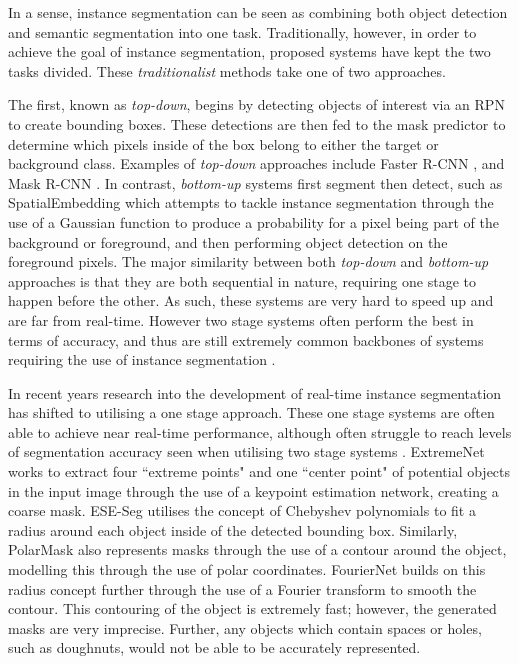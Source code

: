 In a sense, instance segmentation can be seen as combining both object detection and semantic segmentation into one task. Traditionally, however, in order to achieve the goal of instance segmentation, proposed systems have kept the two tasks divided. These \textit{traditionalist} methods take one of two approaches. 

The first, known as \textit{top-down}, begins by detecting objects of interest via an RPN to create bounding boxes. These detections are then fed to the mask predictor to determine which pixels inside of the box belong to either the target or background class. Examples of \textit{top-down} approaches include Faster R-CNN \cite{ren_faster_2015}, and Mask R-CNN \cite{he_mask_2017}. In contrast, \textit{bottom-up} systems first segment then detect, such as SpatialEmbedding \cite{neven_instance_2019} which attempts to tackle instance segmentation through the use of a Gaussian function to produce a probability for a pixel being part of the background or foreground, and then performing object detection on the foreground pixels. The major similarity between both \textit{top-down} and \textit{bottom-up} approaches is that they are both sequential in nature, requiring one stage to happen before the other. As such, these systems are very hard to speed up and are far from real-time. However two stage systems often perform the best in terms of accuracy, and thus are still extremely common backbones of systems requiring the use of instance segmentation \cite{soviany_optimizing_2018}.

In recent years research into the development of real-time instance segmentation has shifted to utilising a one stage approach. These one stage systems are often able to achieve near real-time performance, although often struggle to reach levels of segmentation accuracy seen when utilising two stage systems \cite{soviany_optimizing_2018}. ExtremeNet \cite{zhou_bottom-up_2019} works to extract four ``extreme points" and one ``center point" of potential objects in the input image through the use of a keypoint estimation network, creating a coarse mask. ESE-Seg \cite{xu_explicit_2019} utilises the concept of Chebyshev polynomials to fit a radius around each object inside of the detected bounding box. Similarly, PolarMask \cite{xie_polarmask_2020} also represents masks through the use of a contour around the object, modelling this through the use of polar coordinates. FourierNet \cite{riaz_fouriernet_2020} builds on this radius concept further through the use of a Fourier transform to smooth the contour. This contouring of the object is extremely fast; however, the generated masks are very imprecise. Further, any objects which contain spaces or holes, such as doughnuts, would not be able to be accurately represented. 

